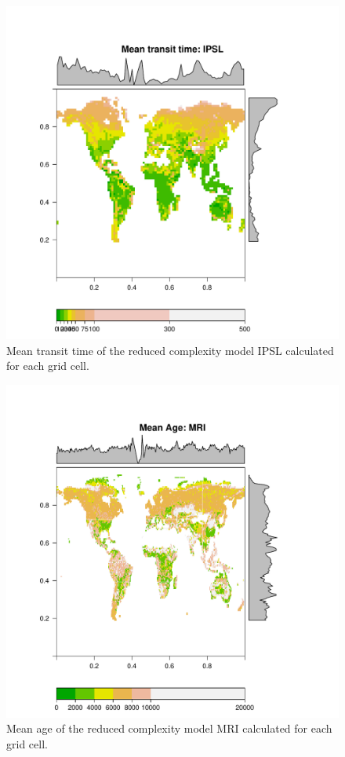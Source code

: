 \documentclass{agujournal}
\begin{document}
\begin{figure}[t]
   \centering
   \includegraphics{Figures/mapTTcolors_IPSL} %
   \caption{Mean transit time of the reduced complexity model IPSL calculated for each grid cell. }
\end{figure}

\begin{figure}[t]
   \centering
   \includegraphics{Figures/mapAcolors_MRI} %
   \caption{Mean age of the reduced complexity model MRI calculated for each grid cell. }
\end{figure}
\end{document}
